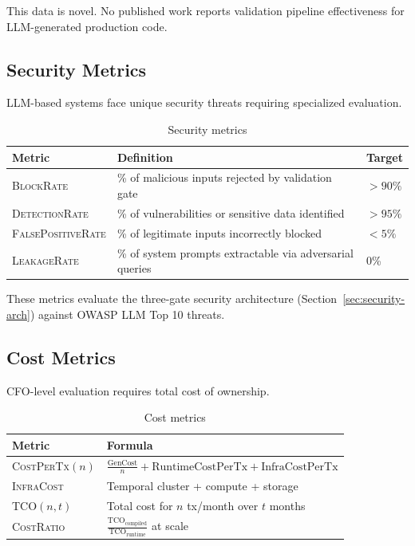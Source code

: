 \documentclass[11pt]{article}
\newcommand{\metric}[1]{\textsc{#1}}
\begin{document}
This data is novel. No published work reports validation pipeline effectiveness for LLM-generated production code.

\subsection{Security Metrics}

LLM-based systems face unique security threats requiring specialized evaluation.

\begin{table}[ht]
\centering
\caption{Security metrics}
\label{tab:security-metrics}
\begin{tabular}{p{3.5cm}p{5cm}p{3.5cm}}
\toprule
Metric & Definition & Target \\
\midrule
\metric{BlockRate} & \% of malicious inputs rejected by validation gate & $> 90\%$ \\
\metric{DetectionRate} & \% of vulnerabilities or sensitive data identified & $> 95\%$ \\
\metric{FalsePositiveRate} & \% of legitimate inputs incorrectly blocked & $< 5\%$ \\
\metric{LeakageRate} & \% of system prompts extractable via adversarial queries & 0\% \\
\bottomrule
\end{tabular}
\end{table}

These metrics evaluate the three-gate security architecture (Section~\ref{sec:security-arch}) against OWASP LLM Top 10 threats.

\subsection{Cost Metrics}

CFO-level evaluation requires total cost of ownership.

\begin{table}[ht]
\centering
\caption{Cost metrics}
\label{tab:cost-metrics}
\begin{tabular}{p{3.5cm}p{8.5cm}}
\toprule
Metric & Formula \\
\midrule
\metric{CostPerTx}$(n)$ & $\frac{\text{GenCost}}{n} + \text{RuntimeCostPerTx} + \text{InfraCostPerTx}$ \\
\metric{InfraCost} & Temporal cluster + compute + storage \\
\metric{TCO}$(n, t)$ & Total cost for $n$ tx/month over $t$ months \\
\metric{CostRatio} & $\frac{\text{TCO}_{\text{compiled}}}{\text{TCO}_{\text{runtime}}}$ at scale \\
\bottomrule
\end{tabular}
\end{table}
\end{document}
